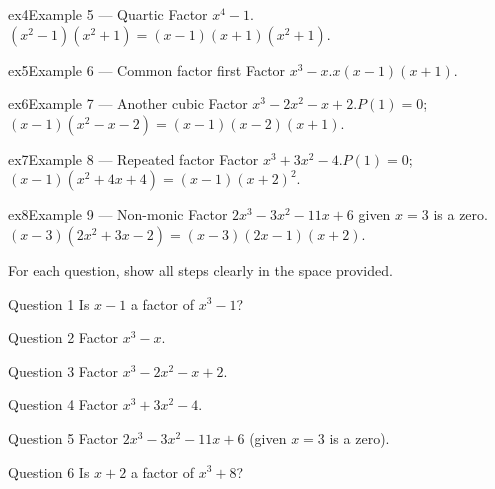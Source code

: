 \documentclass[11pt]{article}
\begin{document}
\begin{example}{ex4}{Example 5 --- Quartic}
Factor $x^4-1$.\soln $(x^2-1)(x^2+1)=(x-1)(x+1)(x^2+1)$.
\end{example}

\begin{example}{ex5}{Example 6 --- Common factor first}
Factor $x^3-x$.\soln $x(x-1)(x+1)$.
\end{example}

\begin{example}{ex6}{Example 7 --- Another cubic}
Factor $x^3-2x^2-x+2$.\soln $P(1)=0$; $(x-1)(x^2-x-2)=(x-1)(x-2)(x+1)$.
\end{example}

\begin{example}{ex7}{Example 8 --- Repeated factor}
Factor $x^3+3x^2-4$.\soln $P(1)=0$; $(x-1)(x^2+4x+4)=(x-1)(x+2)^2$.
\end{example}

\begin{example}{ex8}{Example 9 --- Non-monic}
Factor $2x^3-3x^2-11x+6$ given $x=3$ is a zero.\soln $(x-3)(2x^2+3x-2)=(x-3)(2x-1)(x+2)$.
\end{example}

\clearpage
{}
For each question, show all steps clearly in the space provided.

\begin{qbox}{Question 1}
Is $x-1$ a factor of $x^3-1$?\workspace{2.4cm}
\end{qbox}

\begin{qbox}{Question 2}
Factor $x^3-x$.\workspace{2.4cm}
\end{qbox}

\begin{qbox}{Question 3}
Factor $x^3-2x^2-x+2$.\workspace{2.4cm}
\end{qbox}

\begin{qbox}{Question 4}
Factor $x^3+3x^2-4$.\workspace{2.4cm}
\end{qbox}

\begin{qbox}{Question 5}
Factor $2x^3-3x^2-11x+6$ (given $x=3$ is a zero).\workspace{2.4cm}
\end{qbox}

\begin{qbox}{Question 6}
Is $x+2$ a factor of $x^3+8$?\workspace{2.4cm}
\end{qbox}
\end{document}
